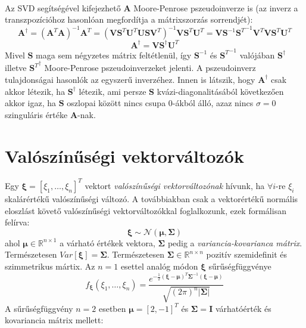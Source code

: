 \documentclass[14p]{report}
\def\pmb{\boldsymbol}
\newcounter{x}
\newcounter{y}
\newcounter{z}
\begin{document}
	\\
	Az SVD segítségével kifejezhető $\pmb{A}$ Moore-Penrose pszeudoinverze is (az inverz a transzpozícióhoz hasonlóan megfordítja a mátrixszorzás sorrendjét):
	\[
		\pmb{A}^{\dagger} = (\pmb{A}^T\pmb{A})^{-1}\pmb{A}^T = (\pmb{V}\pmb{S}^T\pmb{U}^T\pmb{U}\pmb{S}\pmb{V}^T)^{-1}\pmb{V}\pmb{S}^T\pmb{U}^T = \pmb{V}\pmb{S}^{-1}{\pmb{S}^T}^{-1}\pmb{V}^T\pmb{V}\pmb{S}^T\pmb{U}^T
	\]
	\[
		\pmb{A}^{\dagger} = \pmb{V}\pmb{S}^{\dagger}\pmb{U}^T
	\]
	Mivel $\pmb{S}$ maga sem négyzetes mátrix feltétlenül, így $\pmb{S}^{-1}$ és ${\pmb{S}^T}^{-1}$ valójában $\pmb{S}^{\dagger}$ illetve ${\pmb{S}^T}^{\dagger}$ Moore-Penrose pszeudoinverzeket jelenti. A pszeudoinverz tulajdonságai hasonlók az egyszerű inverzéhez.
	Innen is látszik, hogy $\pmb{A}^{\dagger}$ csak akkor létezik, ha $\pmb{S}^{\dagger}$ létezik, ami persze $\pmb{S}$ kvázi-diagonalitásából következően akkor igaz, ha $\pmb{S}$ oszlopai között nincs csupa $0$-ákból álló, azaz nincs $\sigma = 0$ szinguláris értéke $\pmb{A}$-nak.
	
	\section{Valószínűségi vektorváltozók}
	Egy $\pmb{\xi} = [\xi_1, \dots , \xi_n]^T$ vektort \emph{valószínűségi vektorváltozónak} hívunk, ha $\forall i$-re $\xi_i$ skalárértékű valószínűségi változó. A továbbiakban csak a vektorértékű normális eloszlást követő valószínűségi vektorváltozókkal foglalkozunk, ezek formálisan felírva:
	\[
	\pmb{\xi} \sim \mathcal{N}(\pmb{\mu}, \pmb{\Sigma})
	\]
	ahol $\pmb{\mu} \in \mathbb{R}^{n \times 1}$ a várható értékek vektora, $\pmb{\Sigma}$ pedig a \emph{variancia-kovarianca mátrix}. Természetesen $Var[\pmb{\xi}] = \pmb{\Sigma}$. Természetesen $\pmb{\Sigma} \in \mathbb{R}^{n \times n}$ pozitív szemidefinit és szimmetrikus mártix. Az $n = 1$ esettel analóg módon $\pmb{\xi}$ sűrűségfüggvénye
	\[
	f_{\pmb{\xi}}(\xi_1, \dots, \xi_n) = \frac{ e^{-\frac{1}{2}(\pmb{\xi}-\pmb{\mu})^T\pmb{\Sigma}^{-1}(\pmb{\xi}-\pmb{\mu})}}{\sqrt{(2\pi)^n|\pmb{\Sigma}|}}
	\]
	A sűrűségfüggvény $n = 2$ esetben $\pmb{\mu} = [2, -1]^T$ és $\pmb{\Sigma} = \pmb{I}$ várhatóérték és kovariancia mátrix mellett: 
	\def\centerx{2}
	\def\centery{-1}
	
\end{document}

